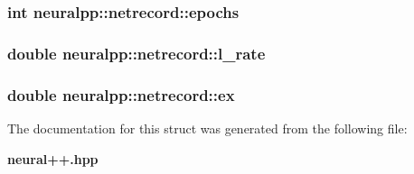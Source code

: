 \subsubsection[epochs]{\setlength{\rightskip}{0pt plus 5cm}int {\bf neuralpp::netrecord::epochs}}\label{structneuralpp_1_1netrecord_ab0149ed5ea0694e88213a07cd4427d1}


\subsubsection[l\_\-rate]{\setlength{\rightskip}{0pt plus 5cm}double {\bf neuralpp::netrecord::l\_\-rate}}\label{structneuralpp_1_1netrecord_a4f793a39a40144e811fef4d3d2d2b30}


\subsubsection[ex]{\setlength{\rightskip}{0pt plus 5cm}double {\bf neuralpp::netrecord::ex}}\label{structneuralpp_1_1netrecord_dcc44fde3f67058d26ef2d5cbd0904e6}




The documentation for this struct was generated from the following file:\begin{CompactItemize}
\item 
{\bf neural++.hpp}\end{CompactItemize}

